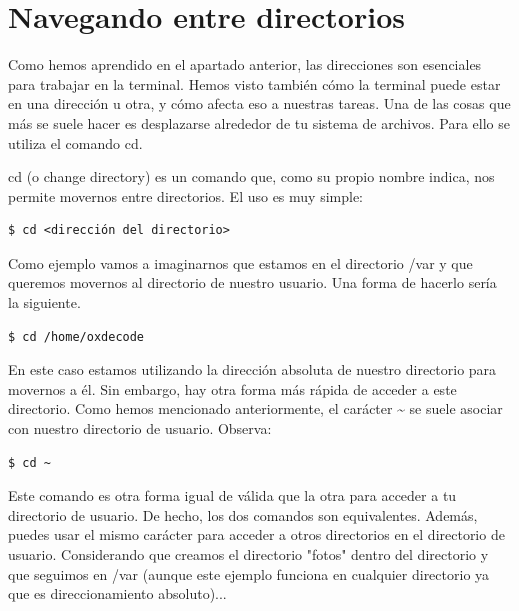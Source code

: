 \section{Navegando entre directorios}
Como hemos aprendido en el apartado anterior, las direcciones son esenciales para trabajar en la terminal. Hemos visto también cómo la terminal puede estar en una dirección u otra, y cómo afecta eso a nuestras tareas. Una de las cosas que más se suele hacer es desplazarse alrededor de tu sistema de archivos. Para ello se utiliza el comando cd.

cd (o change directory) es un comando que, como su propio nombre indica, nos permite movernos entre directorios. El uso es muy simple:

\begin{tcolorbox-code}
\begin{lstlisting}
$ cd <dirección del directorio>
\end{lstlisting}
\end{tcolorbox-code}

Como ejemplo vamos a imaginarnos que estamos en el directorio /var y que queremos movernos al directorio de nuestro usuario. Una forma de hacerlo sería la siguiente.

\begin{tcolorbox-code}
\begin{lstlisting}
$ cd /home/oxdecode
\end{lstlisting}
\end{tcolorbox-code}

En este caso estamos utilizando la dirección absoluta de nuestro directorio para movernos a él. Sin embargo, hay otra forma más rápida de acceder a este directorio. Como hemos mencionado anteriormente, el carácter \textasciitilde{} se suele asociar con nuestro directorio de usuario. Observa:

\begin{tcolorbox-code}
\begin{lstlisting}
$ cd ~
\end{lstlisting}
\end{tcolorbox-code}

Este comando es otra forma igual de válida que la otra para acceder a tu directorio de usuario. De hecho, los dos comandos son equivalentes. Además, puedes usar el mismo carácter para acceder a otros directorios en el directorio de usuario. Considerando que creamos el directorio "fotos" dentro del directorio y que seguimos en /var (aunque este ejemplo funciona en cualquier directorio ya que es direccionamiento absoluto)...

